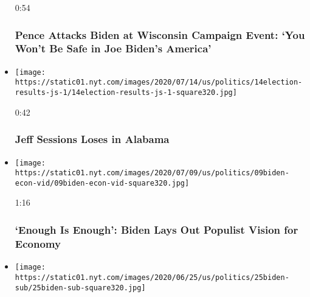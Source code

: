 \begin{itemize}
  0:54

  \hypertarget{pence-attacks-biden-at-wisconsin-campaign-event-you-wont-be-safe-in-joe-bidens-america}{%
  \subsubsection{Pence Attacks Biden at Wisconsin Campaign Event: `You
  Won't Be Safe in Joe Biden's
  America'}\label{pence-attacks-biden-at-wisconsin-campaign-event-you-wont-be-safe-in-joe-bidens-america}}
\item
  \href{https://www.nytimes.com/video/us/politics/100000007239700/jeff-sessions-alabama.html?action=click\&module=video-series-bar\&region=header\&pgtype=Article\&playlistId=video/2020-Elections}{}

  \texttt{[image: https://static01.nyt.com/images/2020/07/14/us/politics/14election-results-js-1/14election-results-js-1-square320.jpg]}

  0:42

  \hypertarget{jeff-sessions-loses-in-alabama}{%
  \subsubsection{Jeff Sessions Loses in
  Alabama}\label{jeff-sessions-loses-in-alabama}}
\item
  \href{https://www.nytimes.com/video/us/politics/100000007231038/live-biden-speech-scranton.html?action=click\&module=video-series-bar\&region=header\&pgtype=Article\&playlistId=video/2020-Elections}{}

  \texttt{[image: https://static01.nyt.com/images/2020/07/09/us/politics/09biden-econ-vid/09biden-econ-vid-square320.jpg]}

  1:16

  \hypertarget{enough-is-enough-biden-lays-out-populist-vision-for-economy}{%
  \subsubsection{`Enough Is Enough': Biden Lays Out Populist Vision for
  Economy}\label{enough-is-enough-biden-lays-out-populist-vision-for-economy}}
\item
  \href{https://www.nytimes.com/video/us/100000007210595/biden-trump-coronavirus.html?action=click\&module=video-series-bar\&region=header\&pgtype=Article\&playlistId=video/2020-Elections}{}

  \texttt{[image: https://static01.nyt.com/images/2020/06/25/us/politics/25biden-sub/25biden-sub-square320.jpg]}


\end{itemize}
